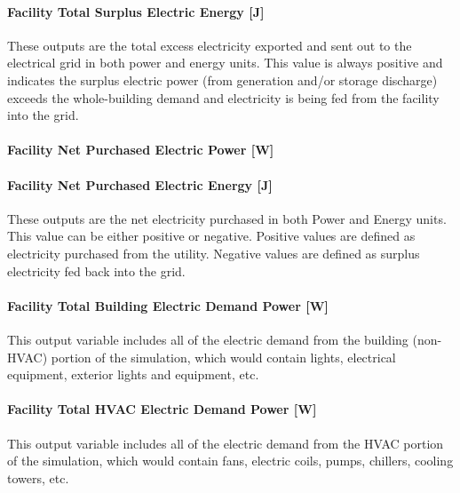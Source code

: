 \paragraph{Facility Total Surplus Electric Energy {[}J{]}}\label{facility-total-surplus-electric-energy-j}

These outputs are the total excess electricity exported and sent out to the electrical grid in both power and energy units. This value is always positive and indicates the surplus electric power (from generation and/or storage discharge) exceeds the whole-building demand and electricity is being fed from the facility into the grid.

\paragraph{Facility Net Purchased Electric Power {[}W{]}}\label{facility-net-purchased-electric-power-w}

\paragraph{Facility Net Purchased Electric Energy {[}J{]}}\label{facility-net-purchased-electric-energy-j}

These outputs are the net electricity purchased in both Power and Energy units. This value can be either positive or negative. Positive values are defined as electricity purchased from the utility. Negative values are defined as surplus electricity fed back into the grid.

\paragraph{Facility Total Building Electric Demand Power {[}W{]}}\label{facility-total-building-electric-demand-power-w}

This output variable includes all of the electric demand from the building (non-HVAC) portion of the simulation, which would contain lights, electrical equipment, exterior lights and equipment, etc.

\paragraph{Facility Total HVAC Electric Demand Power {[}W{]}}\label{facility-total-hvac-electric-demand-power-w}

This output variable includes all of the electric demand from the HVAC portion of the simulation, which would contain fans, electric coils, pumps, chillers, cooling towers, etc.


